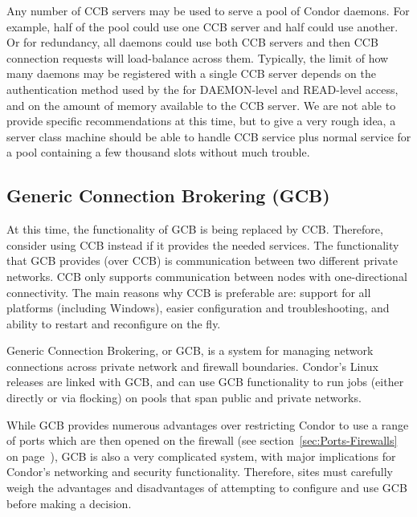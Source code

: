Any number of CCB servers may be used to serve a pool of Condor
daemons.  For example, half of the pool could use one CCB server and
half could use another.  Or for redundancy, all daemons could use both
CCB servers and then CCB connection requests will load-balance
across them.  Typically, the limit of how many daemons may be
registered with a single CCB server depends on the authentication
method used by the  for DAEMON-level and READ-level access,
and on the amount of memory available to the CCB server.  We are not
able to provide specific recommendations at this time, 
but to give a very rough idea,
a server class machine should be able to handle CCB
service plus normal  service for a pool containing
a few thousand slots without much trouble.

\subsection{\label{sec:GCB}Generic Connection Brokering (GCB)}

At this time, the functionality of GCB is being replaced by CCB.
Therefore, consider using CCB instead if it provides the needed services.
The functionality that GCB provides (over CCB)
is communication between two different private networks.
CCB only supports communication between nodes 
with one-directional connectivity.
The main reasons why CCB is preferable are:
support for all platforms (including Windows),
easier configuration and troubleshooting,
and ability to restart and reconfigure on the fly.

Generic Connection Brokering, or GCB, is a system for managing network
connections across private network and firewall boundaries.
Condor's Linux releases are linked with GCB,
and can use GCB functionality to run jobs
(either directly or via flocking)
on pools that span public and private networks.

While GCB provides numerous advantages over restricting Condor to use
a range of ports which are then opened on the firewall (see
section~\ref{sec:Ports-Firewalls} on
page~\pageref{sec:Ports-Firewalls}),
GCB is also a very complicated system, with major
implications for Condor's networking and security functionality.
Therefore, sites must carefully weigh the 
advantages and disadvantages
of attempting
to configure and use GCB before making a decision.

